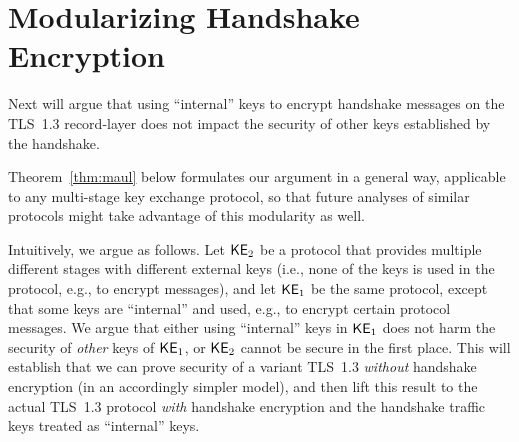 \section{Modularizing Handshake Encryption}
\label{sec:modularizing}

Next will argue that using ``internal'' keys to encrypt handshake messages on the TLS~1.3 record-layer does not impact the security of other keys established by the handshake. 
%

	Theorem~\ref{thm:maul}
		below %
formulates our argument in a general way, applicable to any multi-stage key exchange protocol, so that future analyses of similar protocols might take advantage of this modularity as well.

Intuitively, we argue as follows. Let $\mathsf{KE}_{2}$ be a protocol that provides multiple different stages with different external keys (i.e., none of the keys is used in the protocol, e.g., to encrypt messages), and let $\mathsf{KE}_{1}$ be the same protocol, except that some keys are ``internal'' and used, e.g., to encrypt certain protocol messages.
We argue that either using ``internal'' keys in $\mathsf{KE}_{1}$ does not harm the security of \emph{other} keys of $\mathsf{KE}_{1}$, or $\mathsf{KE}_{2}$ cannot be secure in the first place.
This will establish that we can prove security of a variant TLS~1.3 \emph{without} handshake encryption (in an accordingly simpler model),
and then lift this result to the actual TLS~1.3 protocol \emph{with} handshake encryption and the handshake traffic keys treated as ``internal'' keys.


